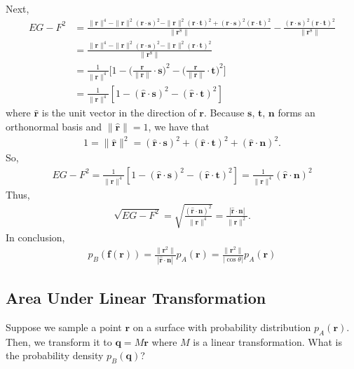 \documentclass[10pt]{article}
\newcommand{\ve}[1]{\mathbf{#1}}
\begin{document}
  Next,
  \begin{align*}
    EG-F^2
    &= \frac{ \| \ve{r} \|^4 - \| \ve{r} \|^2 (\ve{r} \cdot \ve{s})^2 - \| \ve{r} \|^2 (\ve{r} \cdot \ve{t})^2 + (\ve{r} \cdot \ve{s})^2 (\ve{r} \cdot \ve{t})^2   }{\| \ve{r}^8 \|} - \frac{(\ve{r} \cdot \ve{s})^2 (\ve{r} \cdot \ve{t})^2 }{\| \ve{r}^8 \|}\\
    &= \frac{ \| \ve{r} \|^4 - \| \ve{r} \|^2 (\ve{r} \cdot \ve{s})^2 - \| \ve{r} \|^2 (\ve{r} \cdot \ve{t})^2 }{\| \ve{r}^8 \|} \\
    &= \frac{1}{\| \ve{r} \|^4} \bigg[ 1 - \bigg( \frac{\ve{r}}{\| \ve{r} \|} \cdot \ve{s} \bigg)^2 - \bigg( \frac{\ve{r}}{\| \ve{r} \|} \cdot \ve{t} \bigg)^2 \bigg] \\
    &= \frac{1}{\| \ve{r} \|^4}[1 - (\hat{\ve{r}} \cdot \ve{s})^2 - (\hat{\ve{r}} \cdot \ve{t})^2]
  \end{align*}
  where $\hat{\ve{r}}$ is the unit vector in the direction of $\ve{r}$.  Because $\ve{s}$, $\ve{t}$, $\ve{n}$ forms an orthonormal basis and $\| \hat{\ve{r}} \| = 1$, we have that
  \begin{align*}
    1 = \| \hat{\ve{r}} \|^2 = (\hat{\ve{r}} \cdot \ve{s})^2 + (\hat{\ve{r}} \cdot \ve{t})^2 + (\hat{\ve{r}} \cdot \ve{n})^2.
  \end{align*}
  So,
  \begin{align*}
    EG - F^2 
    = \frac{1}{\| \ve{r} \|^4} [1 - (\hat{\ve{r}} \cdot \ve{s})^2 - (\hat{\ve{r}} \cdot \ve{t})^2]
    = \frac{1}{\| \ve{r} \|^4} (\hat{\ve{r}} \cdot \ve{n})^2
  \end{align*}
  Thus,
  \begin{align*}
    \sqrt{EG - F^2} 
    = \sqrt{\frac{(\hat{\ve{r}} \cdot \ve{n})^2}{\| \ve{r} \|^4}}
    = \frac{|\hat{\ve{r}} \cdot \ve{n} |}{\| \ve{r} \|^2}.
  \end{align*}
  In conclusion,
  \begin{align*}
    p_B(\ve{f}(\ve{r})) 
    = \frac{\| \ve{r}^2 \|}{ |\hat{\ve{r}} \cdot \ve{n}| } p_A(\ve{r})
    = \frac{\| \ve{r}^2 \|}{ |\cos\theta| } p_A(\ve{r})
  \end{align*}

  \subsection{Area Under Linear Transformation}
  \label{area-linear-xform}

  Suppose we sample a point $\ve{r}$ on a surface with probability distribution $p_A(\ve{r})$.  Then, we transform it to $\ve{q} = M\ve{r}$ where $M$ is a linear transformation.  What is the probability density $p_B(\ve{q})$?
\end{document}
